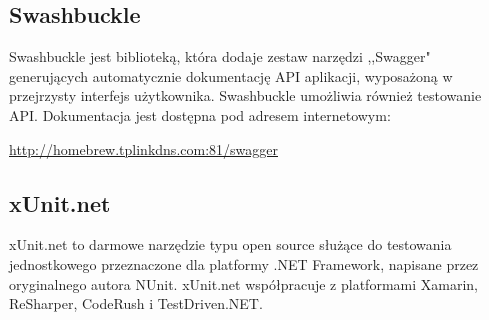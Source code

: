 \documentclass[12pt,a4paper]{article}
\begin{document}
		\subsection{Swashbuckle}
			\indent Swashbuckle jest biblioteką, która dodaje zestaw narzędzi ,,Swagger" generujących automatycznie dokumentację API aplikacji,
				wyposażoną w przejrzysty interfejs użytkownika. Swashbuckle umożliwia również testowanie API. Dokumentacja jest dostępna pod adresem internetowym:
			\begin{tcolorbox}[minipage,colback=white,arc=0pt,outer arc=0pt, fontupper=\scriptsize]
				\center					
				\url{http://homebrew.tplinkdns.com:81/swagger}
			\end{tcolorbox}

		\subsection{xUnit.net}
			\indent xUnit.net to darmowe narzędzie typu open source służące do testowania jednostkowego
			przeznaczone dla platformy .NET Framework, napisane przez oryginalnego autora NUnit.
			xUnit.net współpracuje z platformami Xamarin, ReSharper, CodeRush i TestDriven.NET.
	
	\newpage

\end{document}
